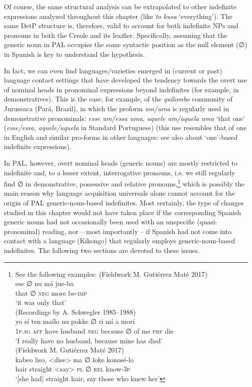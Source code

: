 \documentclass[output=paper,colorlinks,citecolor=brown]{langscibook}
\begin{document}
Of course, the same structural analysis can be extrapolated to other indefinite expressions analyzed throughout this chapter (like \textit{to kusa} ‘everything’). The same DetP structure is, therefore, valid to account for both indefinite NPs and pronouns in both the Creole and its lexifier. Specifically, assuming that the generic noun in PAL occupies the same syntactic position as the null element (∅) in Spanish is key to understand the hypothesis. 

In fact, we can even find languages/varieties emerged in (current or past) language contact settings that have developed the tendency towards the overt use of nominal heads in pronominal expressions beyond indefinites (for example, in demonstratives). This is the case, for example, of the \textit{quilombo} community of Jurussaca (Pará, Brazil), in which the proform \textit{um/uma} is regularly used in demonstrative pronominals: \textit{esse um/essa uma, aquele um/aquela uma} ‘that one’ (\textit{esse/essa, aquele/aquela} in Standard Portuguese) \citep{CamposVale2018} (this use resembles that of one in English and similar pro-forms in other languages: see also \cite[][29, 183--184]{Haspelmath1997} about ‘one’-based indefinite expressions).

In PAL, however, overt nominal heads (generic nouns) are mostly restricted to indefinite and, to a lesser extent, interrogative pronouns, i.e. we still regularly find ∅ in demonstrative, possessive and relative pronouns,\footnote{See the following examples: 
\ea (Fieldwork M. Gutiérrez Maté 2017)\\
    \gll ese ∅ nu má jue-ba\\
    that ∅ \textsc{neg} more be-\textsc{imp}\\
    \glt ‘it was only that’\\
    
    \ex (Recordings by A. Schwegler 1985--1988)\\
     \gll yo sí ten maílo nu pokke ∅ ri mí a morí\\
    \textsc{1p.sg} \textsc{aff} have husband \textsc{neg} because ∅ of me \textsc{prf} die\\
    \glt ‘I really have no husband, because mine has died’\\
    
    \ex (Fieldwork M. Gutiérrez Maté 2017) \\
    \gll kabeo liso, <dise> ma ∅ loke konosé-lo\\
    hair straight <say> \textsc{pl} ∅ \textsc{rel} know-\textsc{3p}\\
    \glt ‘[she had] straight hair, say those who knew her’
\z} which is possibly the main reason why language acquisition universals alone cannot account for the origin of PAL generic-noun-based indefinites. Most certainly, the type of changes studied in this chapter would not have taken place if the corresponding Spanish generic nouns had not occasionally been used with an unspecific (quasi-pronominal) reading, nor -- most importantly -- if Spanish had not come into contact with a language (Kikongo) that regularly employs generic-noun-based indefinites. The following two sections are devoted to these issues.
\end{document}
